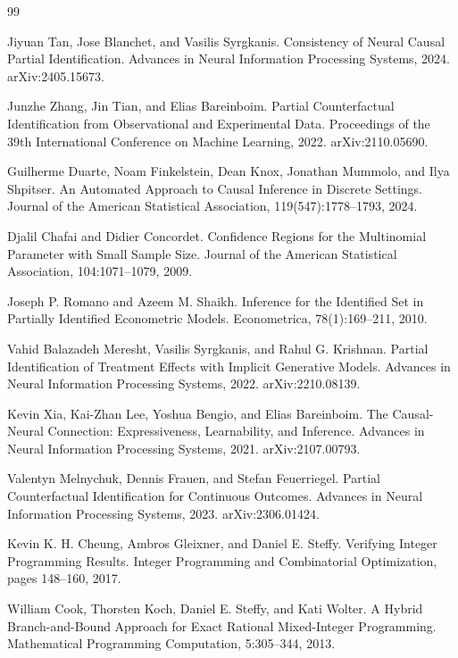 \documentclass{article}
\begin{document}
\begin{thebibliography}{99}

   Jiyuan Tan, Jose Blanchet, and Vasilis Syrgkanis. Consistency of Neural Causal Partial Identification. Advances in Neural Information Processing Systems, 2024. arXiv:2405.15673.

   Junzhe Zhang, Jin Tian, and Elias Bareinboim. Partial Counterfactual Identification from Observational and Experimental Data. Proceedings of the 39th International Conference on Machine Learning, 2022. arXiv:2110.05690.

   Guilherme Duarte, Noam Finkelstein, Dean Knox, Jonathan Mummolo, and Ilya Shpitser. An Automated Approach to Causal Inference in Discrete Settings. Journal of the American Statistical Association, 119(547):1778--1793, 2024.

   Djalil Chafai and Didier Concordet. Confidence Regions for the Multinomial Parameter with Small Sample Size. Journal of the American Statistical Association, 104:1071--1079, 2009.

   Joseph P. Romano and Azeem M. Shaikh. Inference for the Identified Set in Partially Identified Econometric Models. Econometrica, 78(1):169--211, 2010.

   Vahid Balazadeh Meresht, Vasilis Syrgkanis, and Rahul G. Krishnan. Partial Identification of Treatment Effects with Implicit Generative Models. Advances in Neural Information Processing Systems, 2022. arXiv:2210.08139.

   Kevin Xia, Kai-Zhan Lee, Yoshua Bengio, and Elias Bareinboim. The Causal-Neural Connection: Expressiveness, Learnability, and Inference. Advances in Neural Information Processing Systems, 2021. arXiv:2107.00793.

   Valentyn Melnychuk, Dennis Frauen, and Stefan Feuerriegel. Partial Counterfactual Identification for Continuous Outcomes. Advances in Neural Information Processing Systems, 2023. arXiv:2306.01424.

   Kevin K. H. Cheung, Ambros Gleixner, and Daniel E. Steffy. Verifying Integer Programming Results. Integer Programming and Combinatorial Optimization, pages 148--160, 2017.

   William Cook, Thorsten Koch, Daniel E. Steffy, and Kati Wolter. A Hybrid Branch-and-Bound Approach for Exact Rational Mixed-Integer Programming. Mathematical Programming Computation, 5:305--344, 2013.


\end{thebibliography}
\end{document}
